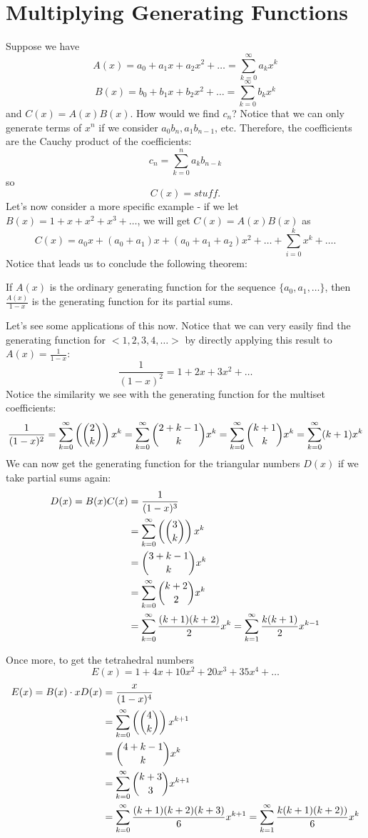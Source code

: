 \documentclass[11pt,twosided]{article}
\begin{document}
\section{Multiplying Generating Functions}
Suppose we have
\[
	A(x) = a_0 + a_1x + a_2x^2 + \ldots = \sum_{k=0}^\infty a_kx^k 
\]
\[
	B(x) = b_0 + b_1x + b_2x^2 + \ldots = \sum_{k=0}^\infty b_kx^k 
\]
and $C(x) = A(x) B(x)$. How would we find $c_n$? Notice that we can only generate terms of $x^n$ if we consider $a_0b_n, a_1b_{n-1}$, etc. Therefore, the coefficients are the Cauchy product of the coefficients: 
\[
	c_n = \sum_{k=0}^n a_k b_{n-k}
\]
so 
\[
	C(x) = stuff.
\]
Let's now consider a more specific example - if we let $B(x) = 1 + x + x^2 + x^3 + \ldots$, we will get $C(x) = A(x)B(x)$ as
\[
	C(x) = a_0x + (a_0+a_1)x + (a_0+a_1+a_2)x^2 + \ldots + \sum_{i=0}^k x^k + \ldots.
\]
Notice that leads us to conclude the following theorem: 
\begin{theorem}
If $A(x)$ is the ordinary generating function for the sequence $\{a_0, a_1, \ldots \}$, then $\frac{A(x)}{1-x}$ is the generating function for its partial sums. 
\end{theorem}

Let's see some applications of this now. Notice that we can very easily find the generating function for $<1, 2, 3, 4, \ldots>$ by directly applying this result to $A(x) = \frac{1}{1-x}$: 
\[
	\frac{1}{(1-x)^2} = 1 + 2x + 3x^2 + \ldots
\]
Notice the similarity we see with the generating function for the multiset coefficients: 
\[
	\frac{1}{(1-x)^2} = \sum_{k=0}^\infty \left(\binom{2}{k}\right)x^k = \sum_{k=0}^\infty \binom{2+k-1}{k}x^k = \sum_{k=0}^\infty \binom{k+1}{k}x^k = \sum_{k=0}^\infty (k+1)x^k 
\]
We can now get the generating function for the triangular numbers $D(x)$ if we take partial sums again: 
\begin{align*}
D(x) = B(x) C(x) &= \frac{1}{(1-x)^3} \\
&= \sum_{k=0}^\infty \left(\binom{3}{k}\right)x^k \\
&= \binom{3+k-1}{k}x^k \\
&= \sum_{k=0}^\infty \binom{k+2}{2}x^k \\
&= \sum_{k=0}^\infty \frac{(k+1)(k+2)}{2}x^k = \sum_{k=1}^\infty \frac{k(k+1)}{2}x^{k-1}
\end{align*}

Once more, to get the tetrahedral numbers 
\[
	E(x) = 1 + 4x + 10x^2 + 20x^3 + 35x^4 + \ldots
\]
\begin{align*}
E(x) = B(x) \cdot x D(x) &= \frac{x}{(1-x)^4} \\
&= \sum_{k=0}^\infty \left(\binom{4}{k}\right)x^{k+1} \\
&= \binom{4+k-1}{k}x^k \\
&= \sum_{k=0}^\infty \binom{k+3}{3}x^{k+1} \\
&= \sum_{k=0}^\infty \frac{(k+1)(k+2)(k+3)}{6}x^{k+1} = \sum_{k=1}^\infty \frac{k(k+1)(k+2))}{6}x^{k}
\end{align*}
\end{document}
